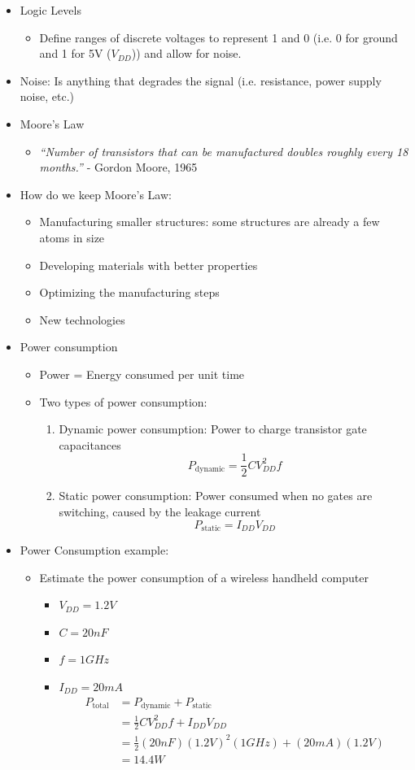\documentclass[a4paper]{article}
\begin{document}
\begin{itemize}
\item Logic Levels
\begin{itemize}
\item Define ranges of discrete voltages to represent 1 and 0 (i.e. 0 for ground and 1 for 5V ($V_{DD}$)) and allow for noise.
\end{itemize}
\item Noise: Is anything that degrades the signal (i.e. resistance, power supply noise, etc.)
\item Moore's Law
\begin{itemize}
\item \emph{``Number of transistors that can be manufactured doubles roughly every 18 months.''} - Gordon Moore, 1965
\end{itemize}
\item How do we keep Moore's Law:
\begin{itemize}
\item Manufacturing smaller structures: some structures are already a few atoms in size
\item Developing materials with better properties
\item Optimizing the manufacturing steps
\item New technologies
\end{itemize}
\item Power consumption
\begin{itemize}
\item Power = Energy consumed per unit time
\item Two types of power consumption:
\begin{enumerate}
\item Dynamic power consumption: Power to charge transistor gate capacitances \[P_{\text{dynamic}}=\frac{1}{2}CV_{DD}^2f\]
\item Static power consumption: Power consumed when no gates are switching, caused by the leakage current \[P_{\text{static}}=I_{DD}V_{DD}\]
\end{enumerate}
\end{itemize}
\item Power Consumption example:
\begin{itemize}
\item Estimate the power consumption of a wireless handheld computer
\begin{itemize}
\item $V_{DD}=1.2V$
\item $C=20nF$
\item $f=1 GHz$
\item $I_{DD}=20 mA$
\begin{align*}
P_{\text{total}}&=P_{\text{dynamic}}+P_{\text{static}}\\
&=\frac{1}{2}CV_{DD}^2f+I_{DD}V_{DD}\\
&=\frac{1}{2}(20 nF)(1.2V)^2(1GHz)+(20mA)(1.2V)\\
&=14.4 W
\end{align*}
\end{itemize}
\end{itemize}

\end{itemize}
\end{document}
